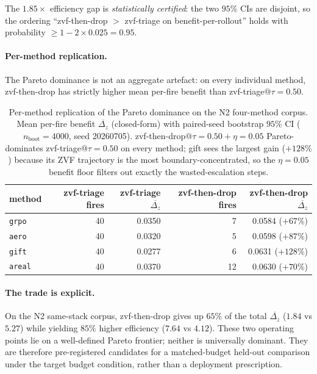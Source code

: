 The $1.85\times$ efficiency gap is \emph{statistically certified}:
the two $95\%$ CIs are disjoint, so the ordering
``zvf-then-drop $>$ zvf-triage on benefit-per-rollout'' holds with
probability $\ge 1 - 2\times 0.025 = 0.95$.

\paragraph{Per-method replication.}
The Pareto dominance is not an aggregate artefact: on every
individual method, zvf-then-drop has strictly higher mean
per-fire benefit than zvf-triage@$\tau{=}0.50$.

\begin{table}[t]
\centering
\caption{Per-method replication of the Pareto dominance on
the N2 four-method corpus. Mean per-fire benefit
$\overline{\Delta_z}$ (closed-form) with paired-seed bootstrap
$95\%$ CI ($n_{\mathrm{boot}}{=}4000$, seed 20260705).
zvf-then-drop@$\tau{=}0.50{+}\eta{=}0.05$ Pareto-dominates
zvf-triage@$\tau{=}0.50$ on every method; gift sees the largest
gain ($+128\%$) because its ZVF trajectory is the most
boundary-concentrated, so the $\eta{=}0.05$ benefit floor filters
out exactly the wasted-escalation steps.}
\label{tab:p7-iter91-permethod}
\begin{tabular}{lrrrr}
\toprule
method & zvf-triage fires & zvf-triage $\overline{\Delta_z}$ & zvf-then-drop fires & zvf-then-drop $\overline{\Delta_z}$ \\
\midrule
\texttt{grpo}  & 40 & 0.0350 & 7  & 0.0584 ($+67\%$) \\
\texttt{aero}  & 40 & 0.0320 & 5  & 0.0598 ($+87\%$) \\
\texttt{gift}  & 40 & 0.0277 & 6  & 0.0631 ($+128\%$) \\
\texttt{areal} & 40 & 0.0370 & 12 & 0.0630 ($+70\%$) \\
\bottomrule
\end{tabular}
\end{table}

\paragraph{The trade is explicit.}
On the N2 same-stack corpus, zvf-then-drop gives up $65\%$ of the total
$\overline{\Delta_z}$ ($1.84$ vs $5.27$) while yielding $85\%$ higher
efficiency ($7.64$ vs $4.12$).  These two operating points lie on a
well-defined Pareto frontier; neither is universally dominant.  They are
therefore pre-registered candidates for a matched-budget held-out comparison
under the target budget condition, rather than a deployment prescription.

